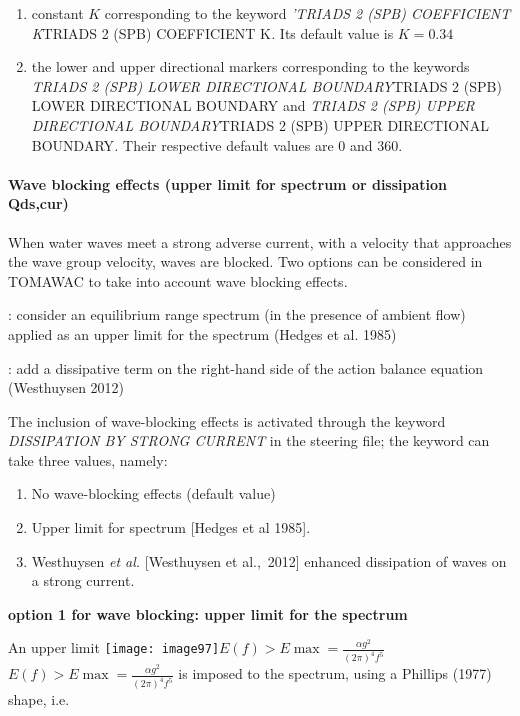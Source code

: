 \begin{enumerate}
\item  constant $K$ corresponding to the keyword \textit{'TRIADS 2 (SPB) COEFFICIENT K}TRIADS 2 (SPB) COEFFICIENT K\textit{.} Its default value is $K=0.34$

\item  the lower and upper directional markers corresponding to the keywords \textit{TRIADS 2 (SPB) LOWER DIRECTIONAL BOUNDARY}TRIADS 2 (SPB) LOWER DIRECTIONAL BOUNDARY\textit{ }and \textit{TRIADS 2 (SPB) UPPER DIRECTIONAL BOUNDARY}TRIADS 2 (SPB) UPPER DIRECTIONAL BOUNDARY\textit{.} Their respective default values are 0 and 360.
\end{enumerate}


\paragraph{ Wave blocking effects (upper limit for spectrum or dissipation Qds,cur)}

 When water waves meet a strong adverse current, with a velocity that approaches the wave group velocity, waves are blocked. Two options can be considered in TOMAWAC to take into account wave blocking effects.

  : consider an equilibrium range spectrum (in the presence of ambient flow) applied as an upper limit for the spectrum (Hedges et al. 1985)

  : add a dissipative term on the right-hand side of the action balance equation (Westhuysen 2012)

 The inclusion of wave-blocking effects is activated through the keyword \textit{DISSIPATION BY STRONG CURRENT} in the steering file; the keyword can take three values, namely:

\begin{enumerate}
\item  No wave-blocking effects (default value)

\item  Upper limit for spectrum [Hedges et al 1985].

\item  Westhuysen \textit{et al.} [Westhuysen et al.,~2012] enhanced dissipation of waves on a strong current.
\end{enumerate}


{\bf  option 1 for wave blocking: upper limit for the spectrum}

 An upper limit \texttt{[image: image97]}$E(f)>E\max =\frac{\alpha g^{2} }{\left(2\pi \right)^{4} f^{5} } $$E(f)>E\max =\frac{\alpha g^{2} }{\left(2\pi \right)^{4} f^{5} } $ is imposed to the spectrum, using a Phillips (1977) shape, i.e.

